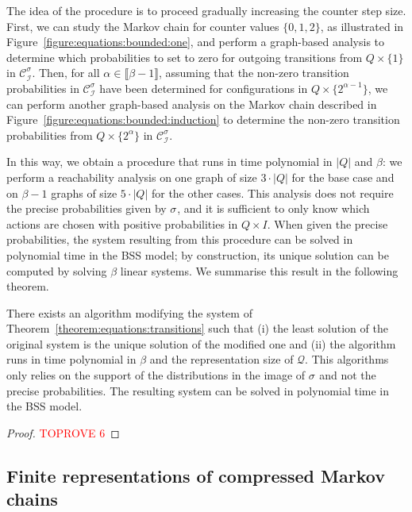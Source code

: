\documentclass[a4paper,UKenglish,cleveref,autoref,thm-restate,colorlinks]{lipics-v2021}
\newcommand{\integerInterval}[1]{\llbracket{}#1\rrbracket{}}
\newcommand{\ocmdp}{\mathcal{Q}}
\newcommand{\ocStateSpace}{Q}
\newcommand{\mchain}{\mathcal{C}}
\newcommand{\intPart}{\mathcal{I}}
\newcommand{\interval}{I}
\newcommand{\powerIndex}{\alpha}
\newcommand{\powerMax}{\beta}
\newcommand{\compressChainStrat}[1]{\mchain^{#1}_{\intPart}}
\newcommand{\compressChain}{\compressChainStrat{\strat}}
\newcommand{\stratGeneric}[1]{{\sigma_{#1}}}
\newcommand{\strat}{\stratGeneric{}}
\begin{document}
The idea of the procedure is to proceed gradually increasing the counter step size.
First, we can study the Markov chain for counter values $\{0, 1, 2\}$, as illustrated in Figure~\ref{figure:equations:bounded:one}, and perform a graph-based analysis to determine which probabilities to set to zero for outgoing transitions from $\ocStateSpace\times\{1\}$ in $\compressChain$.
Then, for all $\powerIndex\in\integerInterval{\powerMax-1}$, assuming that the non-zero transition probabilities in $\compressChain$ have been determined for configurations in $\ocStateSpace\times\{2^{\powerIndex-1}\}$, we can perform another graph-based analysis on the Markov chain described in Figure~\ref{figure:equations:bounded:induction} to determine the non-zero transition probabilities from $\ocStateSpace\times\{2^\powerIndex\}$ in $\compressChain$.

In this way, we obtain a procedure that runs in time polynomial in $|\ocStateSpace|$ and $\powerMax$: we perform a reachability analysis on one graph of size $3\cdot|\ocStateSpace|$ for the base case and on $\powerMax-1$ graphs of size $5\cdot|\ocStateSpace|$ for the other cases.
This analysis does not require the precise probabilities given by $\strat$, and it is sufficient to only know which actions are chosen with positive probabilities in $\ocStateSpace\times\interval$.
When given the precise probabilities, the system resulting from this procedure can be solved in polynomial time in the BSS model; by construction, its unique solution can be computed by solving $\powerMax$ linear systems.
We summarise this result in the following theorem.

\begin{theorem}\label{theorem:equations:transitions:unique}
    There exists an algorithm modifying the system of Theorem~\ref{theorem:equations:transitions} such that (i) the least solution of the original system is the unique solution of the modified one and (ii) the algorithm runs in time polynomial in $\powerMax$ and the representation size of $\ocmdp$.
  This algorithms only relies on the support of the distributions in the image of $\strat$ and not the precise probabilities.
  The resulting system can be solved in polynomial time in the BSS model.
\end{theorem}
\begin{proof}\textcolor{red}{TOPROVE 6}\end{proof}

\subsection{Finite representations of compressed Markov chains}\label{section:abstraction:finiteness}
\end{document}

